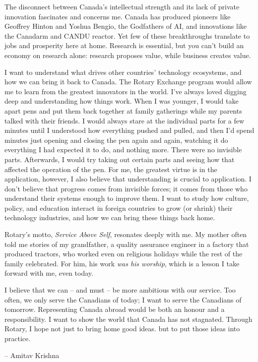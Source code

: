\documentclass[11pt]{article}
\author{Amitav Krishna}
\date{\today}
\title{}
\begin{document}
The disconnect between Canada's intellectual strength and its lack of private innovation fascinates and concerns me. Canada has produced pioneers like Geoffrey Hinton and Yoshua Bengio, the Godfathers of AI, and innovations like the Canadarm and CANDU reactor. Yet few of these breakthroughs translate to jobs and prosperity here at home. Research is essential, but you can't build an economy on research alone: research proposes value, while business creates value.

I want to understand what drives other countries' technology ecosystems, and how we can bring it back to Canada. The Rotary Exchange program would allow me to learn from the greatest innovators in the world. I've always loved digging deep and understanding how things work. When I was younger, I would take apart pens and put them back together at family gatherings while my parents talked with their friends. I would always stare at the individual parts for a few minutes until I understood how everything pushed and pulled, and then I'd spend minutes just opening and closing the pen again and again, watching it do everything I had expected it to do, and nothing more. There were no invisible parts. Afterwards, I would try taking out certain parts and seeing how that affected the operation of the pen. For me, the greatest virtue is in the application, however, I also believe that understanding is crucial to application. I don't believe that progress comes from invisible forces; it comes from those who understand their systems enough to improve them. I want to study how culture, policy, and education interact in foreign countries to grow (or shrink) their technology industries, and how we can bring these things back home.

Rotary's motto, \emph{Service Above Self}, resonates deeply with me. My mother often told me stories of my grandfather, a quality assurance engineer in a factory that produced tractors, who worked even on religious holidays while the rest of the family celebrated. For him, his work \emph{was his worship}, which is a lesson I take forward with me, even today.

I believe that we can -- and must -- be more ambitious with our service. Too often, we only serve the Canadians of today; I want to serve the Canadians of tomorrow. Representing Canada abroad would be both an honour and a responsibility. I want to show the world that Canada has not stagnated. Through Rotary, I hope not just to bring home good ideas. but to put those ideas into practice.

-- Amitav Krishna
\end{document}
